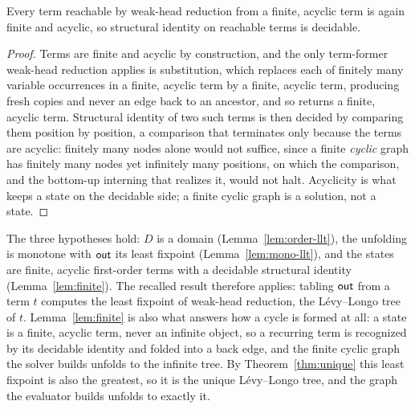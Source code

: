 \begin{lemma}\label{lem:finite}
  Every term reachable by weak-head reduction from a finite, acyclic term is again finite and acyclic, so structural identity on reachable terms is decidable.
\end{lemma}
\begin{proof}
  Terms are finite and acyclic by construction, and the only term-former weak-head reduction applies is substitution, which replaces each of finitely many variable occurrences in a finite, acyclic term by a finite, acyclic term, producing fresh copies and never an edge back to an ancestor, and so returns a finite, acyclic term. Structural identity of two such terms is then decided by comparing them position by position, a comparison that terminates only because the terms are acyclic: finitely many nodes alone would not suffice, since a finite \emph{cyclic} graph has finitely many nodes yet infinitely many positions, on which the comparison, and the bottom-up interning that realizes it, would not halt. Acyclicity is what keeps a state on the decidable side; a finite cyclic graph is a solution, not a state.
\end{proof}

\noindent
The three hypotheses hold: $D$ is a domain (Lemma~\ref{lem:order-llt}), the unfolding is monotone with $\mathsf{out}$ its least fixpoint (Lemma~\ref{lem:mono-llt}), and the states are finite, acyclic first-order terms with a decidable structural identity (Lemma~\ref{lem:finite}). The recalled result therefore applies: tabling $\mathsf{out}$ from a term $t$ computes the least fixpoint of weak-head reduction, the L\'evy--Longo tree of $t$. Lemma~\ref{lem:finite} is also what answers how a cycle is formed at all: a state is a finite, acyclic term, never an infinite object, so a recurring term is recognized by its decidable identity and folded into a back edge, and the finite cyclic graph the solver builds unfolds to the infinite tree. By Theorem~\ref{thm:unique} this least fixpoint is also the greatest, so it is the unique L\'evy--Longo tree, and the graph the evaluator builds unfolds to exactly it.

